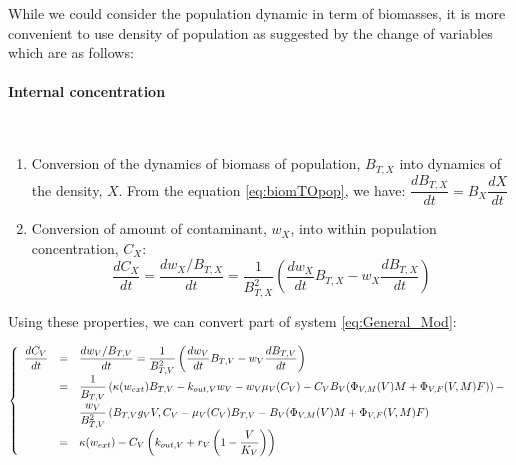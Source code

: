 \documentclass[11pt]{article}
\begin{document}
While we could consider the population dynamic in term of biomasses, it is more convenient to use density of population as suggested by the change of variables which are as follows:

\paragraph{Internal concentration}~\\

\begin{enumerate}
	\item Conversion of the dynamics of biomass of population, $B_{T,X}$ into dynamics of the density, $X$. From the equation \eqref{eq:biomTOpop}, we have: $\dfrac{d B_{T,X}}{dt} = B_X \dfrac{d X}{dt}$
	\item Conversion of amount of contaminant, $w_X$, into within population concentration, $C_X$:	
	$$\dfrac{d C_X}{dt}  = \dfrac{d w_X / B_{T,X}}{dt} = \dfrac{1}{B_{T,X}^2} \left( \dfrac{d w_X}{dt} B_{T,X} - w_X \dfrac{d B_{T,X}}{dt}\right)$$
\end{enumerate}

Using these properties, we can convert part of system \eqref{eq:General_Mod}:


\begin{equation}
\left\lbrace
\begin{array}{c c l}
\dfrac{dC_V}{dt} & = & \dfrac{d w_V / B_{T,V}}{dt} = \dfrac{1}{B_{T,V}^2} \left( \dfrac{d w_V}{dt} B_{T,V} - w_V\dfrac{d B_{T,V}}{d t}\right) \\[3mm]
%
& = & \dfrac{1}{B_{T,V}} \left(\kappa(w_{ext})B_{T,V} - k_{out,V}w_V - w_V \mu_V(C_V) - C_V B_V(\Phi_{V,M}(V)M + \Phi_{V,F}(V,M)F ) \right) - \\[3mm]
& & \dfrac{w_V}{B_{T,V}^2} \left( B_{T,V} g_V{V,C_V} - \mu_V(C_V) B_{T,V} - B_V(\Phi_{V,M}(V)M + \Phi_{V,F}(V,M)F \right)  \\[3mm]
%
& = & \kappa(w_{ext}) - C_V \left( k_{out,V} + r_V\left( 1- \dfrac{V}{K_V} \right)\right)
\end{array}
\right.
\end{equation}
\end{document}
